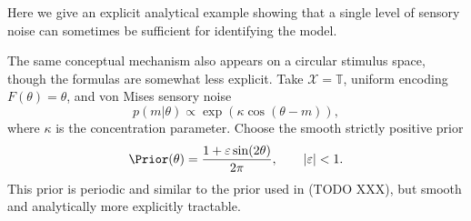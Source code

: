 %
%
%


Here we give an explicit analytical example showing that a single level of sensory noise can sometimes be sufficient for identifying the model.

The same conceptual mechanism also appears on a circular stimulus space, though the formulas are somewhat less explicit.
Take $\mathcal{X}=\mathbb{T}$, uniform encoding $F(\theta)=\theta$, and von Mises sensory noise
\begin{equation}
p(m|\theta)\propto \exp(\kappa \cos(\theta-m)),
\end{equation}
where $\kappa$ is the concentration parameter.
Choose the smooth strictly positive prior
\begin{equation}
\Prior(\theta)=\frac{1+\varepsilon \sin(2\theta)}{2\pi},
\qquad |\varepsilon|<1.
\end{equation}
This prior is periodic and similar to the prior used in (TODO XXX), but smooth and analytically more explicitly tractable.

